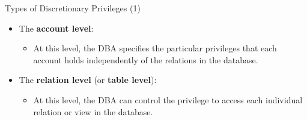 
\begin{frame}{Types of Discretionary Privileges (1)}
    \Large %
    
    \begin{itemize}
        \vspace{-1.5cm} %
        
        \item The \textbf{account level}:
        
        \begin{itemize}
            \large %
            \setlength{\itemsep}{0.2cm}
            
            \item At this level, the DBA specifies the particular privileges that each account holds independently of the relations in the database.
        \end{itemize}
        
        \vspace{0.5cm} %
        
        \item The \textbf{relation level} (or \textbf{table level}):
        
        \begin{itemize}
            \large 
            \setlength{\itemsep}{0.2cm}
            
            \item At this level, the DBA can control the privilege to access each individual relation or view in the database.
        \end{itemize}
        
    \end{itemize}
\end{frame}



